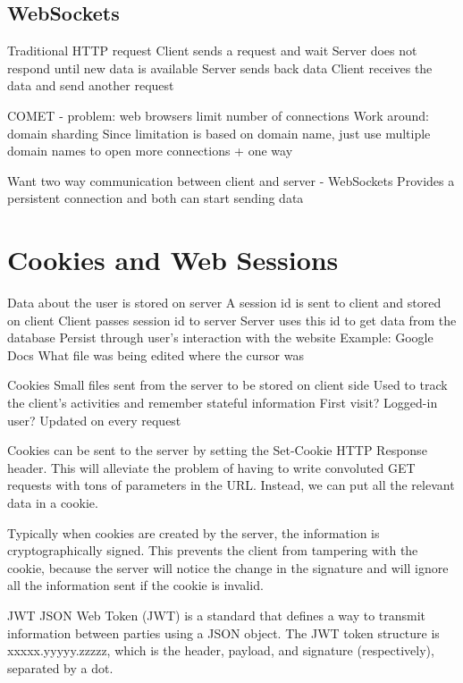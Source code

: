 \documentclass[fancy,11pt,titlestyle=display]{style/elegantbook}
\begin{document}
\subsection*{WebSockets}

\begin{note}
Traditional HTTP request
Client sends a request and wait
Server does not respond until new data is available
Server sends back data
Client receives the data and send another request
\end{note}

COMET - problem: web browsers limit number of connections
Work around: domain sharding
Since limitation is based on domain name, just use multiple domain names to open more connections
+ one way

Want two way communication between client and server - WebSockets
Provides a persistent connection and both can start sending data

\section{Cookies and Web Sessions}

Data about the user is stored on server
A session id is sent to client and stored on client
Client passes session id to server
Server uses this id to get data from the database
Persist through user's interaction with the website
Example: Google Docs
What file was being edited
where the cursor was

\begin{definition}{Cookies}{}
Small files sent from the server to be stored on client side
Used to track the client's activities and remember stateful information
First visit?
Logged-in user?
Updated on every request
\end{definition}

\par Cookies can be sent to the server by setting the Set-Cookie HTTP Response header. This will alleviate the problem of having to write convoluted GET requests with tons of parameters in the URL. Instead, we can put all the relevant data in a cookie.

\par Typically when cookies are created by the server, the information is cryptographically signed. This prevents the client from tampering with the cookie, because the server will notice the change in the signature and will ignore all the information sent if the cookie is invalid.

\begin{definition}{JWT}{}
JSON Web Token (JWT) is a standard that defines a way to transmit information between parties using a JSON object. The JWT token structure is xxxxx.yyyyy.zzzzz, which is the header, payload, and signature (respectively), separated by a dot.
\end{definition}
\end{document}
